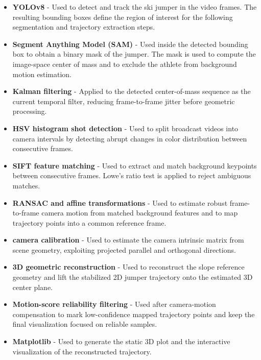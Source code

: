 \begin{itemize}
    \item \textbf{YOLOv8} - Used to detect and track the ski jumper in the video frames. The resulting bounding boxes define the region of interest for the following segmentation and trajectory extraction steps.
    \item \textbf{Segment Anything Model (SAM)} - Used inside the detected bounding box to obtain a binary mask of the jumper. The mask is used to compute the image-space center of mass and to exclude the athlete from background motion estimation.
    \item \textbf{Kalman filtering} - Applied to the detected center-of-mass sequence as the current temporal filter, reducing frame-to-frame jitter before geometric processing.
    \item \textbf{HSV histogram shot detection} - Used to split broadcast videos into camera intervals by detecting abrupt changes in color distribution between consecutive frames.
    \item \textbf{SIFT feature matching} - Used to extract and match background keypoints between consecutive frames. Lowe's ratio test is applied to reject ambiguous matches.
    \item \textbf{RANSAC and affine transformations} - Used to estimate robust frame-to-frame camera motion from matched background features and to map trajectory points into a common reference frame.
    \item \textbf{camera calibration} - Used to estimate the camera intrinsic matrix from scene geometry, exploiting projected parallel and orthogonal directions.
    \item \textbf{3D geometric reconstruction} - Used to reconstruct the slope reference geometry and lift the stabilized 2D jumper trajectory onto the estimated 3D center plane.
    \item \textbf{Motion-score reliability filtering} - Used after camera-motion compensation to mark low-confidence mapped trajectory points and keep the final visualization focused on reliable samples.
    \item \textbf{Matplotlib} - Used to generate the static 3D plot and the interactive visualization of the reconstructed trajectory.
\end{itemize}
